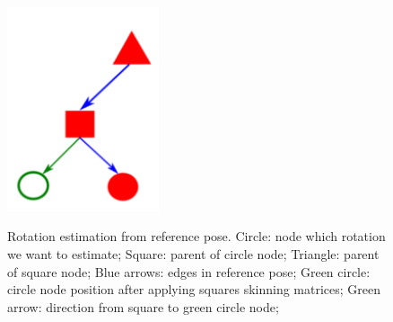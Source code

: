\begin{figure}[h]
    \centering
    \includegraphics[height=6cm]{images/DoF_estimation.png}
    \label{fig:DoF_estimation_ilu}
    \caption[Rotation estimation from reference pose]{Rotation estimation from reference pose. Circle: node which rotation we want to estimate; Square: parent of circle node; Triangle: parent of square node; Blue arrows: edges in reference pose; Green circle: circle node position after applying squares skinning matrices; Green arrow: direction from square to green circle node;}
\end{figure}

